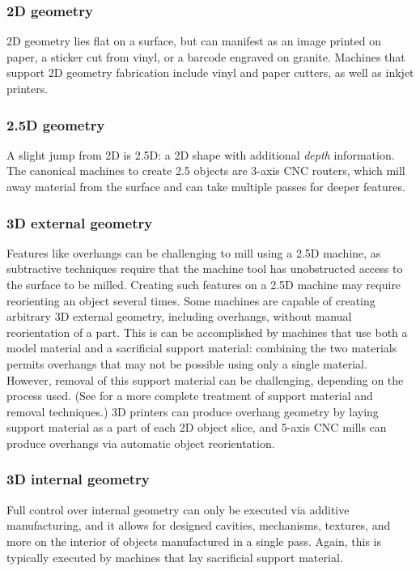 \subsubsection{2D geometry}

2D geometry lies flat on a surface, but can manifest as an image printed on paper, a sticker cut from vinyl, or a barcode engraved on granite. Machines that support 2D geometry fabrication include vinyl and paper cutters, as well as inkjet printers.

\subsubsection{2.5D geometry}

A slight jump from 2D is 2.5D: a 2D shape with additional \emph{depth} information. The canonical machines to create 2.5 objects are 3-axis CNC routers, which mill away material from the surface and can take multiple passes for deeper features.

\subsubsection{3D external geometry}

Features like overhangs can be challenging to mill using a 2.5D machine, as subtractive techniques require that the machine tool has unobstructed access to the surface to be milled. Creating such features on a 2.5D machine may require reorienting an object several times. Some machines are capable of creating arbitrary 3D external geometry, including overhangs, without manual reorientation of a part. This is can be accomplished by machines that use both a model material and a sacrificial support material: combining the two materials permits overhangs that may not be possible using only a single material. However, removal of this support material can be challenging, depending on the process used. (See \cite{savage-sot} for a more complete treatment of support material and removal techniques.) 3D printers can produce overhang geometry by laying support material as a part of each 2D object slice, and 5-axis CNC mills can produce overhangs via automatic object reorientation.

\subsubsection{3D internal geometry}

Full control over internal geometry can only be executed via additive manufacturing, and it allows for designed cavities, mechanisms, textures, and more on the interior of objects manufactured in a single pass. Again, this is typically executed by machines that lay sacrificial support material.

